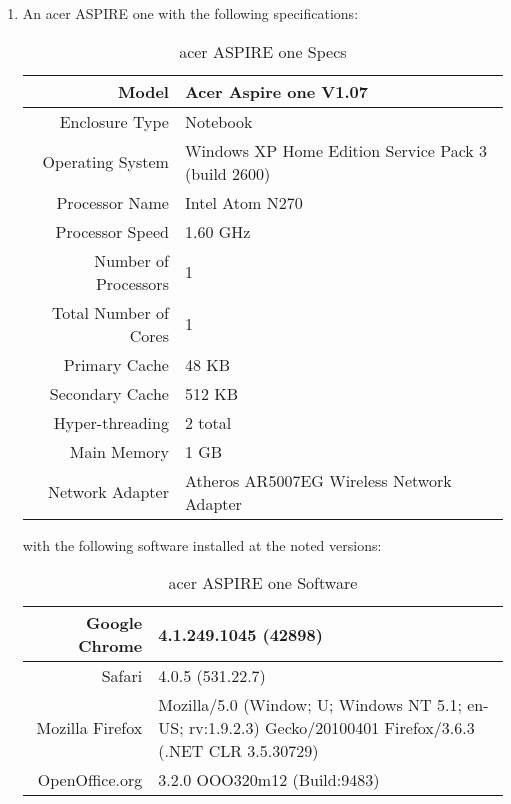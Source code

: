 \begin{enumerate}
\item An acer ASPIRE one with the following specifications:

  \begin{table}
    \begin{tabular}{| r | p{5cm} |}
      \hline
      Model                        & Acer Aspire one V1.07 \\ \hline
      Enclosure Type               & Notebook \\ \hline
      Operating System             & Windows XP Home Edition Service Pack 3 (build
                                     2600) \\ \hline
      Processor Name               & Intel Atom N270 \\ \hline
      Processor Speed              & 1.60 GHz \\ \hline
      Number of Processors         & 1 \\ \hline
      Total Number of Cores        & 1 \\ \hline
      Primary Cache                & 48 KB \\ \hline
      Secondary Cache              & 512 KB \\ \hline
      Hyper-threading              & 2 total \\ \hline
      Main Memory                  & 1 GB \\ \hline
      Network Adapter              & Atheros AR5007EG Wireless Network Adapter \\
      \hline
    \end{tabular}
    \caption{acer ASPIRE one Specs}
    \label{aspireSpecs}
  \end{table}

  with the following software installed at the noted versions:

  \begin{table}
    \begin{tabular}{| r | p{5cm} |}
      \hline
      Google Chrome                & 4.1.249.1045 (42898) \\ \hline
      Safari                       & 4.0.5 (531.22.7) \\ \hline
      Mozilla Firefox              & Mozilla/5.0 (Window; U; Windows NT 5.1;
      en-US; rv:1.9.2.3) Gecko/20100401
      Firefox/3.6.3 (.NET CLR 3.5.30729) \\ \hline
      OpenOffice.org               & 3.2.0 OOO320m12 (Build:9483) \\
      \hline
    \end{tabular}
    \caption{acer ASPIRE one Software}
    \label{aspireSoftware}
  \end{table}


\end{enumerate}
